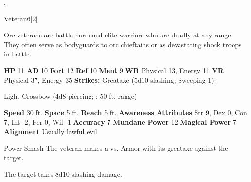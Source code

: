   ,
  \begin{monsubsection}{Veteran}{6}[2]
    \vspace{-1em}\vspace{-1em}
    \vspace{0em}

    
        Orc veterans are battle-hardened elite warriors who are deadly at any range.
        They often serve as bodyguards to orc chieftains or as devastating shock troops in battle.
      
    

    \begin{spellcontent}
      \begin{spelltargetinginfo}
        \pari \textbf{HP} 11 \monsep
          \textbf{AD} 10 \monsep
          \textbf{Fort} 12 \monsep
          \textbf{Ref} 10 \monsep
          \textbf{Ment} 9
        \pari \textbf{WR} Physical 13, Energy 11 \monsep
        \textbf{VR} Physical 37, Energy 35
        \pari \textbf{Strikes:}
            Greataxe  (5d10 slashing; Sweeping 1);
\par Light Crossbow  (4d8 piercing; ; 50 ft. range)
      \end{spelltargetinginfo}
    \end{spellcontent}
    \begin{monsterfooter}
      \pari \textbf{Speed} 30 ft. \monsep
        \textbf{Space} 5 ft. \monsep
        \textbf{Reach} 5 ft.
      \pari \textbf{Awareness} 
      \pari \textbf{Attributes}
        Str 9, Dex 0,
        Con 7, Int -2,
        Per 0, Wil -1
      \pari \textbf{Accuracy} 7 \monsep
        \textbf{Mundane Power} 12 \monsep
      \textbf{Magical Power} 7
      \pari \textbf{Alignment} Usually lawful evil
    \end{monsterfooter}
  \end{monsubsection}
  \begin{freeability}{Power Smash}
       The veteran makes a 
         vs. Armor
        with its greataxe against the target.
    
    \hit The target takes 8d10 slashing damage.
    \end{freeability}
  

